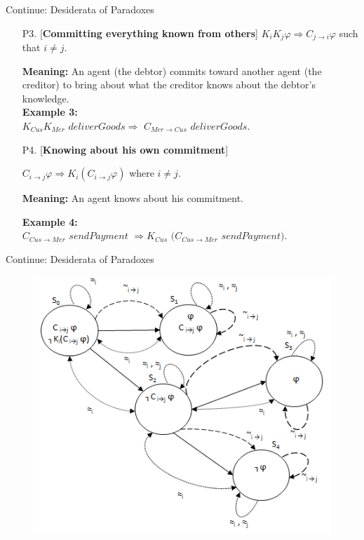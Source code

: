 \documentclass{beamer}
\begin{document}
\begin{frame}{Continue: Desiderata of Paradoxes}
 \begin{enumerate}
\vspace{0.2cm} \item [P3.][\textbf{Committing everything known
from others}]
$ K_i K_j \varphi \Rightarrow C_{j \rightarrow i} \varphi$ such that $ i \neq j$.

\textbf{Meaning:} An agent (the debtor) commits toward another
agent (the creditor) to bring about what the creditor knows about
the debtor's knowledge.\\
\textbf{Example 3:}\\
$K_{Cus} K_{Mer}$ $deliverGoods \Rightarrow$ $C_{Mer \rightarrow Cus}$
$deliverGoods$.

\vspace{0.2cm} \item [P4.][\textbf{Knowing about his own
commitment}]

$C_{i\rightarrow j} \varphi \Rightarrow K_i (C_{i\rightarrow j}
\varphi) $ where $i \neq j$.

\textbf{Meaning:} An agent knows about his commitment.


\textbf{Example 4:}\\
$C_{Cus \rightarrow Mer}$ $sendPayment $ $\Rightarrow K_{Cus}$ $(C_{Cus \rightarrow Mer}$ $sendPayment)$.
\end{enumerate}

        	
\end{frame}


\begin{frame}{Continue: Desiderata of Paradoxes}

\begin{figure}[htbp]
    \begin{center}
    \includegraphics[width=.75 \columnwidth]{figures/figure2.png}
    \end{center}
    \end{figure}
\end{frame}
\end{document}
